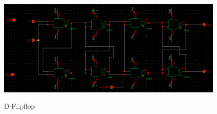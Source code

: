 \begin{figure}[ht]
  \centering
  {\includegraphics[scale=0.47]{img/flipflop.png}}
  \caption{D-Flipflop}
  \label{fig:flipflop}
\end{figure}

\begin{figure}[ht]
  \centering

\end{figure}
